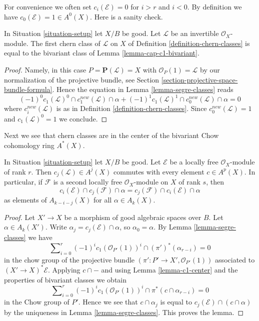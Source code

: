 \noindent
For convenience we often set $c_i(\mathcal{E}) = 0$
for $i > r$ and $i < 0$. By definition
we have $c_0(\mathcal{E}) = 1 \in A^0(X)$.
Here is a sanity check.

\begin{lemma}
\label{lemma-first-chern-class}
In Situation \ref{situation-setup} let $X/B$ be good.
Let $\mathcal{L}$ be an invertible $\mathcal{O}_X$-module.
The first chern class of $\mathcal{L}$ on $X$ of
Definition \ref{definition-chern-classes}
is equal to the bivariant class of Lemma \ref{lemma-cap-c1-bivariant}.
\end{lemma}

\begin{proof}
Namely, in this case $P = \mathbf{P}(\mathcal{L}) = X$ with
$\mathcal{O}_P(1) = \mathcal{L}$ by our normalization of the
projective bundle, see Section \ref{section-projective-space-bundle-formula}.
Hence the equation in Lemma \ref{lemma-segre-classes}
reads
$$
(-1)^0 c_1(\mathcal{L})^0 \cap c^{new}_1(\mathcal{L}) \cap \alpha +
(-1)^1 c_1(\mathcal{L})^1 \cap c^{new}_0(\mathcal{L}) \cap \alpha = 0
$$
where $c_i^{new}(\mathcal{L})$ is as in
Definition \ref{definition-chern-classes}.
Since $c_0^{new}(\mathcal{L}) = 1$ and $c_1(\mathcal{L})^0 = 1$
we conclude.
\end{proof}

\noindent
Next we see that chern classes are in the center of the bivariant
Chow cohomology ring $A^*(X)$.

\begin{lemma}
\label{lemma-cap-commutative-chern}
In Situation \ref{situation-setup} let $X/B$ be good.
Let $\mathcal{E}$ be a locally free $\mathcal{O}_X$-module of rank $r$.
Then $c_j(\mathcal{L}) \in A^j(X)$ commutes with every
element $c \in A^p(X)$. In particular, if $\mathcal{F}$ is a
second locally free $\mathcal{O}_X$-module on $X$ of rank $s$, then
$$
c_i(\mathcal{E}) \cap c_j(\mathcal{F}) \cap \alpha
=
c_j(\mathcal{F}) \cap c_i(\mathcal{E}) \cap \alpha
$$
as elements of $A_{k - i - j}(X)$ for all $\alpha \in A_k(X)$.
\end{lemma}

\begin{proof}
Let $X' \to X$ be a morphism of good algebraic spaces over $B$.
Let $\alpha \in A_k(X')$. Write $\alpha_j = c_j(\mathcal{E}) \cap \alpha$, so
$\alpha_0 = \alpha$. By Lemma \ref{lemma-segre-classes} we have
$$
\sum\nolimits_{i = 0}^r
(-1)^i c_1(\mathcal{O}_{P'}(1))^i \cap
(\pi')^*(\alpha_{r - i}) = 0
$$
in the chow group of the projective bundle
$(\pi' : P' \to X', \mathcal{O}_{P'}(1))$
associated to $(X' \to X)^*\mathcal{E}$.
Applying $c \cap -$ and using Lemma \ref{lemma-c1-center}
and the properties of bivariant classes we obtain
$$
\sum\nolimits_{i = 0}^r
(-1)^i c_1(\mathcal{O}_{P'}(1))^i \cap
\pi^*(c \cap \alpha_{r - i}) = 0
$$
in the Chow group of $P'$. Hence we see that $c \cap \alpha_j$ is
equal to $c_j(\mathcal{E}) \cap (c \cap \alpha)$ by the uniqueness in
Lemma \ref{lemma-segre-classes}. This proves the lemma.
\end{proof}

